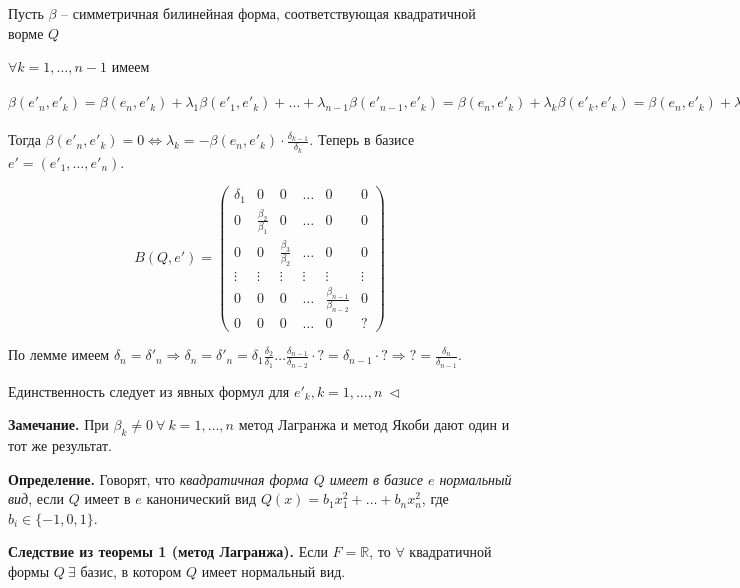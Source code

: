 Пусть $\beta$ -- симметричная билинейная форма, соответствующая квадратичной ворме $Q$

$\forall k = 1, \dots, n-1$ имеем 

$\beta(e'_n, e'_k) = \beta(e_n, e'_k) + \lambda_1 \beta(e'_1, e'_k) + \dots + \lambda_{n-1} \beta(e'_{n-1}, e'_k) = \beta(e_n, e'_k) + \lambda_k \beta(e'_k, e'_k) =\beta(e_n, e'_k) + \lambda_k \frac{\beta_k}{\beta_{k-1}} $

\vspace{\baselineskip}
Тогда $\beta(e'_n, e'_k) = 0 \Leftrightarrow \lambda_k = -\beta(e_n, e'_k) \cdot \frac{\delta_{k-1}}{\delta_{k}}$. Теперь в базисе $e' = (e'_1, \dots, e'_n)$.

\[ B(Q, e') = \begin{pmatrix} \delta_1 & 0 & 0 & \dots & 0 & 0 \\ 0 & \frac{\beta_2}{\beta_1} & 0 & \dots & 0 & 0 \\ 0 & 0 & \frac{\beta_3}{\beta_2} & \dots & 0 & 0 \\ \vdots & \vdots & \vdots & \vdots & \vdots & \vdots \\ 0 & 0 & 0 & \dots & \frac{\beta_{n-1}}{\beta_{n-2}} & 0 \\ 0 & 0 & 0 & \dots & 0 & ? \end{pmatrix}
\]

\vspace{\baselineskip}
По лемме имеем $\delta_n = \delta'_n \Rightarrow \delta_n = \delta'_n = \delta_1 \frac{\delta_2}{\delta_1} \dots \frac{\delta_{n-1}}{\delta_{n-2}} \cdot ? = \delta_{n-1} \cdot ? \Rightarrow ? = \frac{\delta_n}{\delta_{n-1}}$.

Единственность следует из явных формул для $e'_k, k = 1, \dots, n \ \lhd$

\vspace{\baselineskip}
\textbf{Замечание.} При $\beta_k \neq 0 \ \forall \ k = 1, \dots, n$ метод Лагранжа и метод Якоби дают один и тот же результат. 

\vspace{\baselineskip}
\textbf{Определение.} Говорят, что \textit{квадратичная форма $Q$ имеет в базисе $e$ нормальный вид}, если $Q$ имеет в $e$ канонический вид $Q(x) = b_1 x_1^2 + \dots + b_n x_n^2$, где $b_i \in \{-1, 0, 1\}$.

\vspace{\baselineskip}
\textbf{Следствие из теоремы 1 (метод Лагранжа).} Если $F = \mathbb{R}$, то $\forall$ квадратичной формы $Q \ \exists$ базис, в котором $Q$ имеет нормальный вид.

